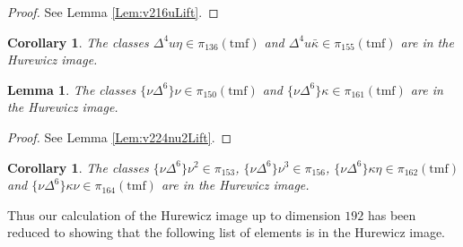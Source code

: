 \documentclass[10pt]{amsart}
\newcommand{\tmf}{\mathrm{tmf}}
\newtheorem{cor}[equation]{Corollary}
\newtheorem{lem}[equation]{Lemma}
\theoremstyle{definition}
\numberwithin{equation}{section}
\numberwithin{figure}{section}
\begin{document}
\begin{proof}
See Lemma \ref{Lem:v216uLift}. 
\end{proof}

\begin{cor}
The classes $\Delta^4 u \eta \in \pi_{136}(\tmf)$ and $\Delta^4 u \bar{\kappa} \in \pi_{155}(\tmf)$ are in the Hurewicz image. 
\end{cor}

%


\begin{lem}\label{Lem:v224nu2}
The classes $\{ \nu \Delta^6 \} \nu \in \pi_{150}(\tmf)$ and $\{\nu \Delta^6 \} \kappa \in \pi_{161}(\tmf)$ are in the Hurewicz image.
\end{lem}

\begin{proof}
See Lemma \ref{Lem:v224nu2Lift}. 
\end{proof}

\begin{cor}\label{Cor:v224nu2}
The classes $\{\nu \Delta^6\} \nu^2 \in \pi_{153}$, $\{ \nu \Delta^6 \} \nu^3 \in \pi_{156}$, $\{\nu \Delta^6 \} \kappa \eta \in \pi_{162}(\tmf)$ and $\{ \nu \Delta^6 \} \kappa \nu \in \pi_{164}(\tmf)$ are in the Hurewicz image.
\end{cor}

%


Thus our calculation of the Hurewicz image up to dimension $192$ has been reduced to showing that the following list of elements is in the Hurewicz image. 
\end{document}
